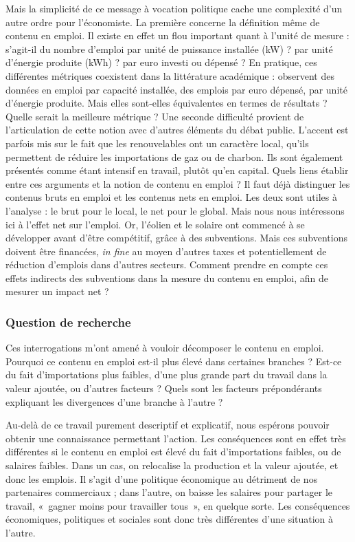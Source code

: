 Mais la simplicité de ce message à vocation politique cache une complexité d’un autre ordre pour l’économiste. 
La première concerne la définition même de contenu en emploi. Il existe en effet un flou important quant à l’unité de mesure : s’agit-il du nombre d’emploi par unité de puissance installée (kW) ? par unité d’énergie produite (kWh) ? par euro investi ou dépensé ? En pratique, ces différentes métriques coexistent dans la littérature académique : \citet{Cameron2015} observent des données en emploi par capacité installée, \citet{Quirion2013} des emplois par euro dépensé, \citet{Wei2010} par unité d’énergie produite. Mais elles sont-elles équivalentes en termes de résultats ? Quelle serait la meilleure métrique ?
Une seconde difficulté provient de l’articulation de cette notion avec d’autres éléments du débat public. L’accent est parfois mis sur le fait que les renouvelables ont un caractère local, qu’ils permettent de réduire les importations de gaz ou de charbon. Ils sont également présentés comme étant intensif en travail, plutôt qu’en capital. Quels liens établir entre ces arguments et la notion de contenu en emploi ?
Il faut déjà distinguer les contenus bruts en emploi et les contenus nets en emploi. Les deux sont utiles à l'analyse : le brut pour le local, le net pour le global. Mais nous nous intéressons ici à l’effet net sur l’emploi. Or, l'éolien et le solaire ont commencé à se développer avant d’être compétitif, grâce à des subventions. Mais ces subventions doivent être financées, \textit{in fine} au moyen d’autres taxes et potentiellement de réduction d’emplois dans d’autres secteurs. Comment prendre en compte ces effets indirects des subventions dans la mesure du contenu en emploi, afin de mesurer un impact net ?

\subsubsection{Question de recherche}
Ces interrogations m’ont amené à vouloir décomposer le contenu en emploi. Pourquoi ce contenu en emploi est-il plus élevé dans certaines branches ? Est-ce du fait d’importations plus faibles, d’une plus grande part du travail dans la valeur ajoutée, ou d’autres facteurs ?  Quels sont les facteurs prépondérants expliquant les divergences d’une branche à l’autre ?

Au-delà de ce travail purement descriptif et explicatif, nous espérons pouvoir obtenir une connaissance permettant l’action. Les conséquences sont en effet très différentes si le contenu en emploi est élevé du fait d’importations faibles, ou de salaires faibles. Dans un cas, on relocalise la production et la valeur ajoutée, et donc les emplois. Il s’agit d’une politique économique au détriment de nos partenaires commerciaux ; dans l’autre, on baisse les salaires pour partager le travail,  «~gagner moins pour travailler tous~», en quelque sorte. Les conséquences économiques, politiques et sociales sont donc très différentes d’une situation à l’autre.

